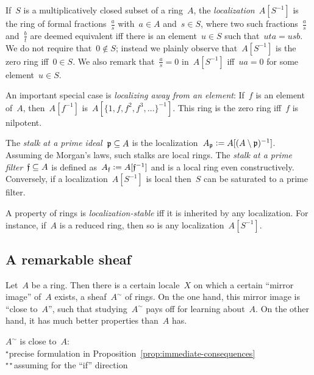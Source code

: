 \documentclass{ws-rv9x6}
\begin{document}
{If~$S$ is a multiplicatively closed subset of a ring~$A$, the
\emph{localization}~$A[S^{-1}]$ is the ring of formal fractions~$\frac{a}{s}$ with~$a
\in A$ and~$s \in S$, where two such fractions~$\frac{a}{s}$ and~$\frac{b}{t}$ are deemed
equivalent iff there is an element~$u \in S$ such that~$uta = usb$. We do not
require that~$0 \not\in S$; instead we plainly observe that~$A[S^{-1}]$ is the
zero ring iff~$0 \in S$. We also remark that~$\frac{a}{s} = 0$ in~$A[S^{-1}]$
iff~$ua = 0$ for some element~$u \in S$.

An important special case is \emph{localizing away from an element}: If~$f$ is
an element of~$A$, then~$A[f^{-1}]$ is~$A[\{1,f,f^2,f^3,\ldots\}^{-1}]$. This
ring is the zero ring iff~$f$ is nilpotent.

The \emph{stalk at a prime ideal}~$\mathfrak{p} \subseteq A$ is the
localization~$A_{\mathfrak{p}} \vcentcolon= A[(A \setminus \mathfrak{p})^{-1}]$. Assuming de Morgan's
laws, such stalks are local rings. The \emph{stalk at a prime filter}~$\mathfrak{f} \subseteq A$ is
defined as~$A_{\mathfrak{f}} \vcentcolon= A[\mathfrak{f}^{-1}]$ and is a local ring even
constructively. Conversely, if a localization~$A[S^{-1}]$ is local then~$S$ can
be saturated to a prime filter.

A property of rings is \emph{localization-stable} iff it is inherited by any
localization. For instance, if~$A$ is a reduced ring, then so is any
localization~$A[S^{-1}]$.


\subsection{A remarkable sheaf}
\label{sect:a-remarkable-sheaf}

Let~$A$ be a ring. Then there is a certain locale~$X$ on which a
certain ``mirror image'' of~$A$ exists, a sheaf~$A^\sim$ of rings. On the one hand,
this mirror image is ``close to~$A$'', such that studying~$A^\sim$ pays off for
learning about~$A$. On the other hand, it has much better properties than~$A$
has.

\begin{center}
\vbox{$A^\sim$ is close to~$A$: \\[0.6em]
}
\hfill $^\star$precise formulation in
Proposition~{\ref{prop:immediate-consequences}}{\quad}\phantom{\,\,}\\
\hfill $^{\star\!\star}$assuming \BPIT for the ``if'' direction{\quad}
\bigskip


\end{center}}
\end{document}
